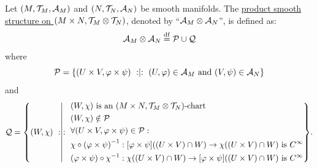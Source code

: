 \documentclass[11pt,reqno]{amsart}
\renewcommand{\phi}{\varphi}
\begin{document}
\begin{Def}
Let $(M,\mathcal{T}_M,\mathcal{A}_M)$ and $(N,\mathcal{T}_N,\mathcal{A}_N)$ be smooth manifolds.
The \ul{product smooth structure on $(M\times N,\mathcal{T}_M\otimes\mathcal{T}_N)$},
denoted by ``$\mathcal{A}_M\otimes\mathcal{A}_N$'', is defined as:
\[\begin{aligned}
&\mathcal{A}_M\otimes\mathcal{A}_N\stackrel{\mathrm{df}}{=}\mathcal P\cup\mathcal Q\\
\end{aligned}\]
where
\[
\mathcal P
=\set{(U\times V,\phi\times\psi)\st(U,\phi)\in\A_M\tand(V,\psi)\in\A_N}
\]
and
\[
\mathcal Q=\set{(W,\chi)\st
\begin{aligned}
&(W,\chi)~\text{is an $(M\times N,\T_M\otimes\T_N)$-chart}\\
&(W,\chi)\notin\mathcal P\\
&\forall (U\times V,\phi\times\psi)\in\mathcal P:\\
&\chi\circ\Br{\phi\times\psi}\inv:
\FUNC{\phi\times\psi}{(U\times V)\cap W}\to
\chi((U\times V)\cap W)~\text{is $C^\infty$}\\
&\Br{\phi\times\psi}\circ\chi\inv:
\chi((U\times V)\cap W)\to
\FUNC{\phi\times\psi}{(U\times V)\cap W}~\text{is $C^\infty$}\\
\end{aligned}
}.
\]
\end{Def}
\end{document}

